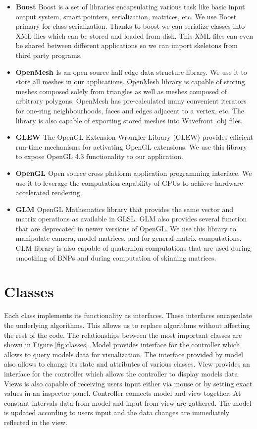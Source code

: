 \begin{itemize}
	\item \textbf{Boost \cite{Boost}} Boost is a set of libraries encapsulating various task like basic input output system, smart pointers, serialization, matrices, etc. We use Boost primary for class serialization. Thanks to boost we can serialize classes into XML files which can be stored and loaded from disk. This XML files can even be shared between different applications so we can import skeletons from third party programs.
	\item \textbf{OpenMesh \cite{OpenMesh}} Is an open source half edge data structure library. We use it to store all meshes in our applications. OpenMesh library is capable of storing meshes composed solely from triangles as well as meshes composed of arbitrary polygons. OpenMesh has pre-calculated many convenient iterators for one-ring neighbourhoods, faces and edges adjacent to a vertex, etc. The library is also capable of exporting stored meshes into Wavefront .obj files.
	\item \textbf{GLEW \cite{glew}} The OpenGL Extension Wrangler Library (GLEW) provides efficient run-time mechanisms for activating OpenGL extensions. We use this library to expose OpenGL 4.3 functionality to our application.
	\item \textbf{OpenGL \cite{opengl}} Open source cross platform application programming interface. We use it to leverage the computation capability of GPUs to achieve hardware accelerated rendering.
	\item \textbf{GLM \cite{glm}} OpenGL Mathematics library that provides the same vector and matrix operations as available in GLSL. GLM also provides several function that are deprecated in newer versions of OpenGL. We use this library to manipulate camera, model matrices, and for general matrix computations. GLM library is also capable of quaternion computations that are used during smoothing of BNPs and during computation of skinning matrices.
\end{itemize}

\pagebreak

\section{Classes}

Each class implements its functionality as interfaces.
These interfaces encapsulate the underlying algorithms.
This allows us to replace algorithms without affecting the rest of the code.
The relationships between the most important classes are shown in Figure \ref{fig:classes}.
Model provides interface for the controller which allows to query models data for visualization.
The interface provided by model also allows to change its state and attributes of various classes.
View provides an interface for the controller which allows the controller to display models data.
Views is also capable of receiving users input either via mouse or by setting exact values in an inspector panel.
Controller connects model and view together.
At constant intervals data from model and input from view are gathered.
The model is updated according to users input and the data changes are immediately reflected in the view.

